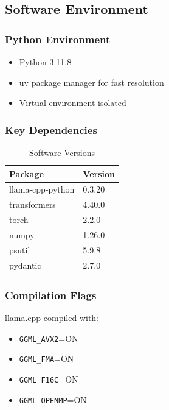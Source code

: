 \subsection{Software Environment}

\subsubsection{Python Environment}

\begin{itemize}
    \item Python 3.11.8
    \item uv package manager for fast resolution
    \item Virtual environment isolated
\end{itemize}

\subsubsection{Key Dependencies}

\begin{table}[h]
\centering
\caption{Software Versions}
\label{tab:software_versions}
\begin{tabular}{ll}
\toprule
\textbf{Package} & \textbf{Version} \\
\midrule
llama-cpp-python & 0.3.20 \\
transformers & 4.40.0 \\
torch & 2.2.0 \\
numpy & 1.26.0 \\
psutil & 5.9.8 \\
pydantic & 2.7.0 \\
\bottomrule
\end{tabular}
\end{table}

\subsubsection{Compilation Flags}

llama.cpp compiled with:

\begin{itemize}
    \item \texttt{GGML\_AVX2}=ON
    \item \texttt{GGML\_FMA}=ON
    \item \texttt{GGML\_F16C}=ON
    \item \texttt{GGML\_OPENMP}=ON
\end{itemize}


